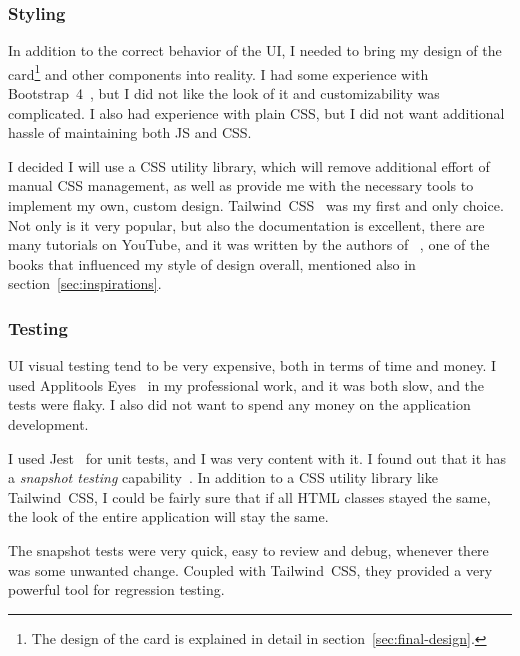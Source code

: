\subsubsection{Styling}\label{sec:ui-styling}

In addition to the correct behavior of the \ac{UI},
I needed to bring my design of the card\footnote{
  The design of the card
  is explained in detail
  in section~\ref{sec:final-design}.
} and other components
into reality.
I had some experience with Bootstrap~4~\cite{otto_bootstrap_2018},
but I did not like the look of it
and customizability was complicated.
I also had experience with plain \ac{CSS},
but I did not want additional hassle
of maintaining both \ac{JS} and \ac{CSS}.

I decided I will use a \ac{CSS} utility library,
which will remove additional effort
of manual \ac{CSS} management,
as well as provide me with the necessary tools
to implement my own, custom design.
Tailwind~CSS~\cite{wathan_tailwind_2022}
was my first and only choice.
Not only is it very popular,
but also the documentation is excellent,
there are many tutorials on YouTube,
and it was written by the authors
of ~\cite{wathan_refactoring_2018},
one of the books that influenced
my style of design overall,
mentioned also in section~\ref{sec:inspirations}.

\subsubsection{Testing}\label{sec:ui-testing}

\Ac{UI} visual testing tend to be very expensive,
both in terms of time and money.
I used Applitools Eyes~\cite{applitools_applitools_2022}
in my professional work,
and it was both slow,
and the tests were flaky.
I also did not want to spend any money
on the application development.

I used Jest~\cite{bekkhus_jest_2022} for unit tests,
and I was very content with it.
I found out that it has
a \textit{snapshot testing} capability~\cite{bekkhus_snapshot_2022}.
In addition to a \ac{CSS} utility library
like Tailwind~CSS,
I could be fairly sure
that if all \ac{HTML} classes stayed the same,
the look of the entire application
will stay the same.

The snapshot tests were very quick,
easy to review and debug,
whenever there was some unwanted change.
Coupled with Tailwind~CSS,
they provided a very powerful tool
for regression testing.

